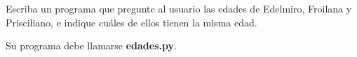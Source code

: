 \documentclass[12pt,spanish,letterpaper]{article}
\begin{document}
  Escriba un programa que pregunte al usuario
  las edades de Edelmiro, Froilana y Prisciliano,
  e indique cuáles de ellos tienen la misma edad.

  \begin{minipage}[t]{.8\textwidth}
    
  \end{minipage}

  \begin{minipage}[t]{.8\textwidth}
    
  \end{minipage}

  \begin{minipage}[t]{.8\textwidth}
    
  \end{minipage}

  Su programa debe llamarse \textbf{edades.py}.
\end{document}

